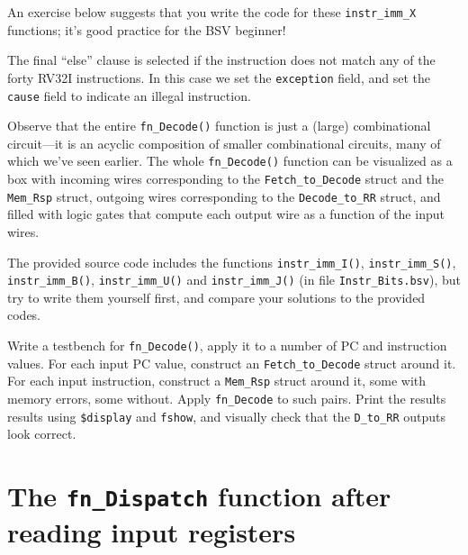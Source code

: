 An exercise below suggests that you write the code for these
\verb|instr_imm_X| functions; it's good practice for the BSV beginner!

The final ``else'' clause is selected if the instruction does not
match any of the forty RV32I instructions.  In this case we set the
\verb|exception| field, and set the \verb|cause| field to indicate an
illegal instruction.

Observe that the entire \verb|fn_Decode()| function is just a (large)
combinational circuit---it is an acyclic composition of smaller
combinational circuits, many of which we've seen earlier.  The whole
\verb|fn_Decode()| function can be visualized as a box with incoming
wires corresponding to the \verb|Fetch_to_Decode| struct and the
\verb|Mem_Rsp| struct, outgoing wires corresponding to the
\verb|Decode_to_RR| struct, and filled with logic gates that compute
each output wire as a function of the input wires.


\hdivider

\Exercise

The provided source code includes the functions \verb|instr_imm_I()|,
\verb|instr_imm_S()|, \verb|instr_imm_B()|, \verb|instr_imm_U()| and
\verb|instr_imm_J()| (in file \verb|Instr_Bits.bsv|), but try to write
them yourself first, and compare your solutions to the provided codes.

\Exercise

Write a testbench for \verb|fn_Decode()|, apply it to a number of PC
and instruction values.  For each input PC value, construct an
\verb|Fetch_to_Decode| struct around it.  For each input instruction,
construct a \verb|Mem_Rsp| struct around it, some with memory errors,
some without.  Apply \verb|fn_Decode| to such pairs.  Print the
results results using \verb|$display| and \verb|fshow|, and visually
check that the \verb|D_to_RR| outputs look correct.

\Endexercise


\section{The {\tt fn\_Dispatch} function after reading input registers}

\label{Sec_fn_Dispatch}

